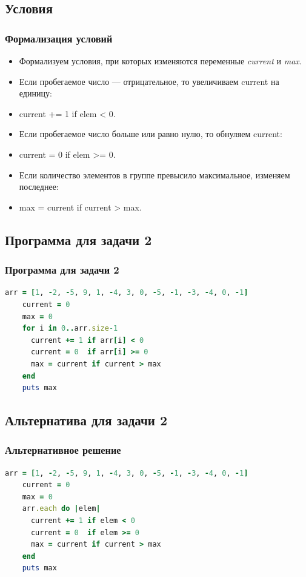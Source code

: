 \documentclass[compress,red]{beamer}
\begin{document}
\subsection{Условия}
\begin{frame}[fragile]
  \frametitle{Формализация условий}
  \begin{itemize}
    \item Формализуем условия, при которых изменяются переменные \emph{current} и \emph{max}.
    \item Если пробегаемое число --- отрицательное, то увеличиваем current на единицу:
    \item current += 1 if elem < 0.
    \item Если пробегаемое число больше или равно нулю, то обнуляем current:
    \item current = 0 if elem >= 0.
    \item Если количество элементов в группе превысило максимальное, изменяем последнее:
    \item max = current if current > max.
  \end{itemize}
\end{frame}

\subsection{Программа для задачи 2}
\begin{frame}[fragile]
  \frametitle{Программа для задачи 2}
  
  \scriptsize{
  \begin{lstlisting}[language=ruby,basicstyle=\footnotesize,label=ruby3,caption=Задача 2]
    arr = [1, -2, -5, 9, 1, -4, 3, 0, -5, -1, -3, -4, 0, -1]
    current = 0
    max = 0
    for i in 0..arr.size-1
      current += 1 if arr[i] < 0
      current = 0  if arr[i] >= 0
      max = current if current > max
    end
    puts max
  \end{lstlisting}
  }
  
\end{frame}

\subsection{Альтернатива для задачи 2}
\begin{frame}[fragile]
  \frametitle{Альтернативное решение}
  \scriptsize{
  \begin{lstlisting}[language=ruby,basicstyle=\footnotesize,label=ruby4,caption=Альтернативное решение задачи 2]
    arr = [1, -2, -5, 9, 1, -4, 3, 0, -5, -1, -3, -4, 0, -1]
    current = 0
    max = 0
    arr.each do |elem|
      current += 1 if elem < 0
      current = 0  if elem >= 0
      max = current if current > max
    end
    puts max
  \end{lstlisting}
  }
  
\end{frame}
\end{document}
